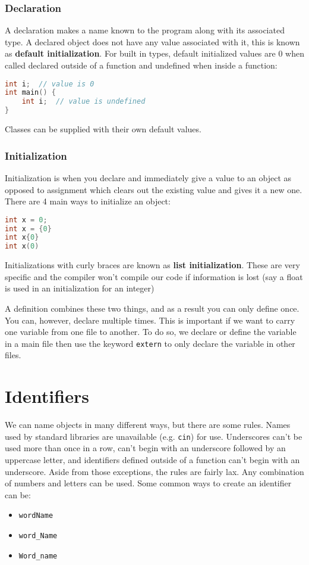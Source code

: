 \documentclass[12pt, a4paper]{report}
\begin{document}
\subsubsection{Declaration}
A declaration makes a name known to the program along with its associated type. A declared object does not have any value associated with it, this is known as \textbf{default initialization}. For built in types, default initialized values are 0 when called declared outside of a function and undefined when inside a function:
\begin{lstlisting}[language=C++]
int i;	// value is 0
int main() {
    int i;	// value is undefined
}
\end{lstlisting}
\noindent Classes can be supplied with their own default values.
\subsubsection{Initialization}
Initialization is when you declare and immediately give a value to an object as opposed to assignment which clears out the existing value and gives it a new one.
There are 4 main ways to initialize an object:
\begin{lstlisting}[language=C++]
int x = 0;
int x = {0}
int x{0}
int x(0)
\end{lstlisting}
Initializations with curly braces are known as \textbf{list initialization}. These are very specific and the compiler won't compile our code if information is lost (say a float is used in an initialization for an integer)

A definition combines these two things, and as a result you can only define once. You can, however, declare multiple times.
This is important if we want to carry one variable from one file to another. To do so, we declare or define the variable in a main file then use the keyword \verb|extern| to only declare the variable in other files.
\section{Identifiers}
We can name objects in many different ways, but there are some rules. Names used by standard libraries are unavailable (e.g. \verb|cin|) for use. Underscores can't be used more than once in a row, can't begin with an underscore followed by an uppercase letter, and identifiers defined outside of a function can't begin with an underscore. Aside from those exceptions, the rules are fairly lax. Any combination of numbers and letters can be used. Some common ways to create an identifier can be:
\begin{center}
  \begin{itemize}
    \item \verb|wordName|
    \item \verb|word_Name|
    \item \verb|Word_name|
  \end{itemize}
\end{center}
\end{document}
